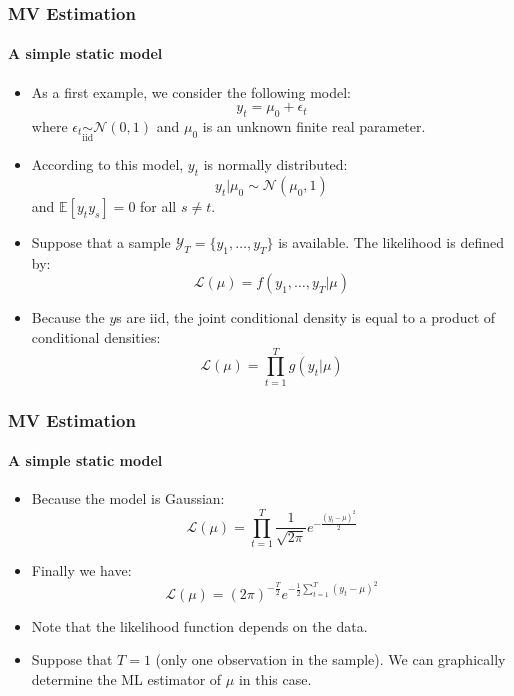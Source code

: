 \documentclass[10pt,slidestop]{beamer}
\newcommand{\normal}[2]{\mathcal N\left(#1,#2\right)}
\newcommand{\AllSample}{ \mathcal Y_T }
\begin{document}
\begin{frame}
  \frametitle{MV Estimation}
  \framesubtitle{A simple static model}
  \begin{itemize}
    \item As a first example, we consider the following model:
      \begin{equation}
        \label{eq:simple-static-model:1}\tag{2-a}
        y_t = \mu_0 + \epsilon_t
      \end{equation}
      where $\epsilon_t\underset{\mathrm{iid}}{\sim}\normal{0}{1}$ and
      $\mu_0$ is an unknown finite real parameter.
      \bigskip
    \item According to this model, $y_t$ is normally distributed:
      \[
      y_t|\mu_0 \sim \normal{\mu_0}{1}
      \]
      and $\mathbb E[y_ty_s] = 0$ for all $s\neq t$.
      \medskip
    \item Suppose that a sample $\AllSample = \{y_1,\dots,y_T\}$ is
      available. The likelihood is defined by:
      \[
      \mathcal L (\mu) = f(y_1,\dots,y_T|\mu)
      \]
      \medskip
    \item Because the $y$s are $\mathrm{iid}$, the joint conditional
      density is equal to a product of conditional densities:
      \[
      \mathcal L (\mu) = \prod_{t=1}^T g(y_t|\mu)
      \]
    \end{itemize}
\end{frame}

\begin{frame}
  \frametitle{MV Estimation}
  \framesubtitle{A simple static model}
  \begin{itemize}
    \item Because the model is Gaussian:
      \[
      \mathcal L (\mu) = \prod_{t=1}^T \frac{1}{\sqrt{2\pi}}e^{-\frac{(y_t-\mu)^2}{2}}
      \]
      \bigskip
    \item Finally we have:
      \begin{equation}
        \label{eq:simple-static-model:2}\tag{2-b}
        \mathcal L (\mu) = (2\pi)^{-\frac{T}{2}}e^{-\frac{1}{2}\sum_{t=1}^T(y_t-\mu)^2}
      \end{equation}
      \bigskip
    \item Note that the likelihood function depends on the data.
      \bigskip
    \item Suppose that $T=1$ (only one observation in the sample). We can
      graphically determine the ML estimator of $\mu$ in this case.
    \end{itemize}
\end{frame}
\end{document}
